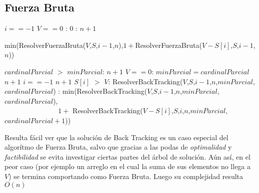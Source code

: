\subsection{Fuerza Bruta}




\begin{codebox}
    \li \If $i == -1$ 
        \Then
    \li        \If $V == 0$ : 
                \Then
    \li             \Return $0$
    \li         \Else: 
    \li                 \Return $n+1$
                \End
                \End

    \li \Return min(ResolverFuerzaBruta($V$,$S$,$i-1$,$n$),$1 +$ResolverFuerzaBruta($V-S[i]$,$S$,$i-1$,$n$))

    \end{codebox}

\begin{codebox}
    \li \If $cardinalParcial$ $>$ $minParcial$: 
        \Then
    \li        \Return $n+1$ \End
    \li \If $V == 0$:
         \Then
    \li         $minParcial = cardinalParcial$
    \li         \Return $n+1$ 
    \End
    \li \If $i == -1$ 
        \Then
    \li                 \Return $n+1$
                \End
    \li \If $S[i]$ $>$ $V$: 
        \Then 
    \li         \Return  ResolverBackTracking($V$,$S$,$i-1$,$n$,$minParcial$,$cardinalParcial$)
    \li    \Else:
    \li          \Return min(ResolverBackTracking($V$,$S$,$i-1$,$n$,$minParcial$,$cardinalParcial$),
                            \\ $\qquad\qquad$$\qquad\quad\,\,$ $1+$ ResolverBackTracking($V-S[i]$,$S$,$i$,$n$,$minParcial$,$cardinalParcial+1$))



    \end{codebox}

\par Resulta f\'acil ver que la soluci\'on de Back Tracking es un caso especial del algor\'itmo de Fuerza Bruta,
salvo que gracias a las podas de \textit{optimalidad} y \textit{factibilidad} se evita investigar ciertas partes del
\'arbol de soluci\'on. A\'un as\'i, en el peor caso (por ejemplo un arreglo en el cual la suma de sus elementos no llega
a $V$) se termina comportando como Fuerza Bruta. Luego su complejidad resulta $O(n)$

